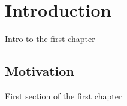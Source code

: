 \chapter{Introduction}
\label{ch:Intro}
Intro to the first chapter

\section{Motivation}
\label{sec:Motivation}
First section of the first chapter